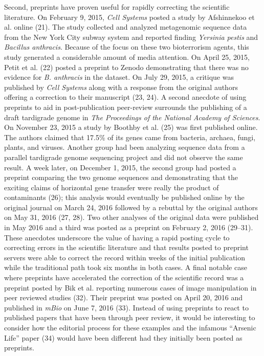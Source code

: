 \documentclass[11pt,]{article}
\begin{document}
Second, preprints have proven useful for rapidly correcting the
scientific literature. On February 9, 2015, \emph{Cell Systems} posted a
study by Afshinnekoo et al. online (21). The study collected and
analyzed metagenomic sequence data from the New York City subway system
and reported finding \emph{Yersinia pestis} and \emph{Bacillus
anthracis}. Because of the focus on these two bioterrorism agents, this
study generated a considerable amount of media attention. On April 25,
2015, Petit et al. (22) posted a preprint to Zenodo demonstrating that
there was no evidence for \emph{B. anthracis} in the dataset. On July
29, 2015, a critique was published by \emph{Cell Systems} along with a
response from the original authors offering a correction to their
manuscript (23, 24). A second anecdote of using preprints to aid in
post-publication peer-review surrounds the publishing of a draft
tardigrade genome in \emph{The Proceedings of the National Academy of
Sciences}. On November 23, 2015 a study by Boothby et al. (25) was first
published online. The authors claimed that 17.5\% of its genes came from
bacteria, archaea, fungi, plants, and viruses. Another group had been
analyzing sequence data from a parallel tardigrade genome sequencing
project and did not observe the same result. A week later, on December
1, 2015, the second group had posted a preprint comparing the two genome
sequences and demonstrating that the exciting claims of horizontal gene
transfer were really the product of contaminants (26); this analysis
would eventually be published online by the original journal on March
24, 2016 followed by a rebuttal by the original authors on May 31, 2016
(27, 28). Two other analyses of the original data were published in May
2016 and a third was posted as a preprint on February 2, 2016 (29--31).
These anecdotes underscore the value of having a rapid posting cycle to
correcting errors in the scientific literature and that results posted
to preprint servers were able to correct the record within weeks of the
initial publication while the traditional path took six months in both
cases. A final notable case where preprints have accelerated the
correction of the scientific record was a preprint posted by Bik et al.
reporting numerous cases of image manipulation in peer reviewed studies
(32). Their preprint was posted on April 20, 2016 and published in
\emph{mBio} on June 7, 2016 (33). Instead of using preprints to react to
published papers that have been through peer review, it would be
interesting to consider how the editorial process for these examples and
the infamous ``Arsenic Life'' paper (34) would have been different had
they initially been posted as preprints.
\end{document}
